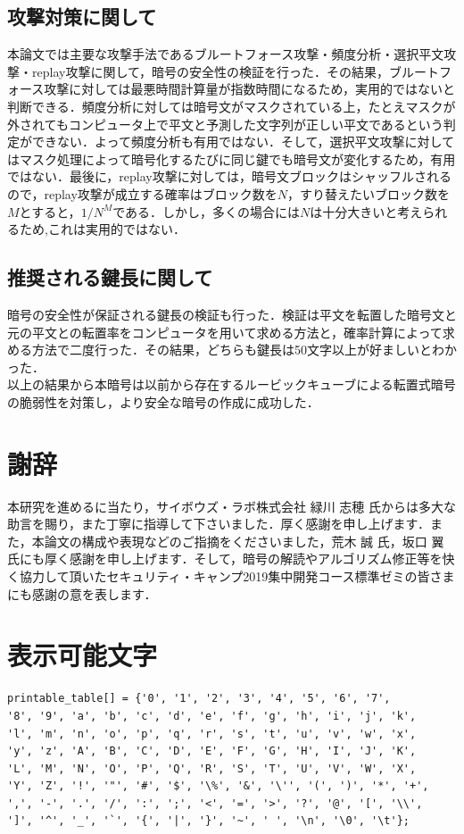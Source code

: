 \documentclass[a4j,titlepage]{jsarticle}
\begin{document}
\subsection{攻撃対策に関して}
本論文では主要な攻撃手法であるブルートフォース攻撃・頻度分析・選択平文攻撃・replay攻撃に関して，暗号の安全性の検証を行った．その結果，ブルートフォース攻撃に対しては最悪時間計算量が指数時間になるため，実用的ではないと判断できる．頻度分析に対しては暗号文がマスクされている上，たとえマスクが外されてもコンピュータ上で平文と予測した文字列が正しい平文であるという判定ができない．よって頻度分析も有用ではない．そして，選択平文攻撃に対してはマスク処理によって暗号化するたびに同じ鍵でも暗号文が変化するため，有用ではない．最後に，replay攻撃に対しては，暗号文ブロックはシャッフルされるので，replay攻撃が成立する確率はブロック数を\(N\)，すり替えたいブロック数を\(M\)とすると，\(1/N^M\)である．しかし，多くの場合には\(N\)は十分大きいと考えられるため,これは実用的ではない．

\subsection{推奨される鍵長に関して}
暗号の安全性が保証される鍵長の検証も行った．検証は平文を転置した暗号文と元の平文との転置率をコンピュータを用いて求める方法と，確率計算によって求める方法で二度行った．その結果，どちらも鍵長は50文字以上が好ましいとわかった．\\

以上の結果から本暗号は以前から存在するルービックキューブによる転置式暗号の脆弱性を対策し，より安全な暗号の作成に成功した．

\section{謝辞}
本研究を進めるに当たり，サイボウズ・ラボ株式会社 緑川 志穂 氏からは多大な助言を賜り，また丁寧に指導して下さいました．厚く感謝を申し上げます．また，本論文の構成や表現などのご指摘をくださいました，荒木 誠 氏，坂口 翼 氏にも厚く感謝を申し上げます．そして，暗号の解読やアルゴリズム修正等を快く協力して頂いたセキュリティ・キャンプ2019集中開発コース標準ゼミの皆さまにも感謝の意を表します．

\appendix
\section{表示可能文字}
\begin{verbatim}
printable_table[] = {'0', '1', '2', '3', '4', '5', '6', '7', 
'8', '9', 'a', 'b', 'c', 'd', 'e', 'f', 'g', 'h', 'i', 'j', 'k', 
'l', 'm', 'n', 'o', 'p', 'q', 'r', 's', 't', 'u', 'v', 'w', 'x', 
'y', 'z', 'A', 'B', 'C', 'D', 'E', 'F', 'G', 'H', 'I', 'J', 'K', 
'L', 'M', 'N', 'O', 'P', 'Q', 'R', 'S', 'T', 'U', 'V', 'W', 'X', 
'Y', 'Z', '!', '"', '#', '$', '\%', '&', '\'', '(', ')', '*', '+', 
',', '-', '.', '/', ':', ';', '<', '=', '>', '?', '@', '[', '\\', 
']', '^', '_', '`', '{', '|', '}', '~', ' ', '\n', '\0', '\t'};
\end{verbatim}
\end{document}
